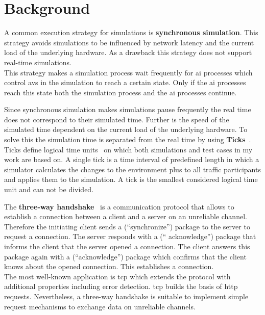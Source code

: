 \section{Background}\label{sec:background}
A common execution strategy for simulations is \textbf{synchronous simulation}.
This strategy avoids simulations to be influenced by network latency and the current load of the underlying hardware.
As a drawback this strategy does not support real-time simulations.\\
This strategy makes a simulation process wait frequently for \gls{ai} processes which control \glspl{av} in the simulation to reach a certain state.
Only if the \gls{ai} processes reach this state both the simulation process and the \gls{ai} processes continue.\par

Since synchronous simulation makes simulations pause frequently the real time does not correspond to their simulated time.
Further is the speed of the simulated time dependent on the current load of the underlying hardware.
To solve this the simulation time is separated from the real time by using \textbf{Ticks}~\cite{tickrate}.
Ticks define logical time units~\cite{logicalTime} on which both simulations and test cases in my work are based on.
A single tick is a time interval of predefined length in which a simulator calculates the changes to the environment plus to all traffic participants and applies them to the simulation.
A tick is the smallest considered logical time unit and can not be divided.\par

The \textbf{three-way handshake}~\cite{computernetzwerke} is a communication protocol that allows to establish a connection between a client and a server on an unreliable channel.
Therefore the initiating client sends a  (\enquote{synchronize}) package to the server to request a connection.
The server responds with a  (\enquote{ acknowledge}) package that informs the client that the server opened a connection.
The client answers this package again with a  (\enquote{acknowledge}) package which confirms that the client knows about the opened connection.
This establishes a connection.\\
The most well-known application is \gls{tcp} which extends the protocol with additional properties including error detection.
\Gls{tcp} builds the basis of \gls{http} requests.
Nevertheless, a three-way handshake is suitable to implement simple request mechanisms to exchange data on unreliable channels.\par

